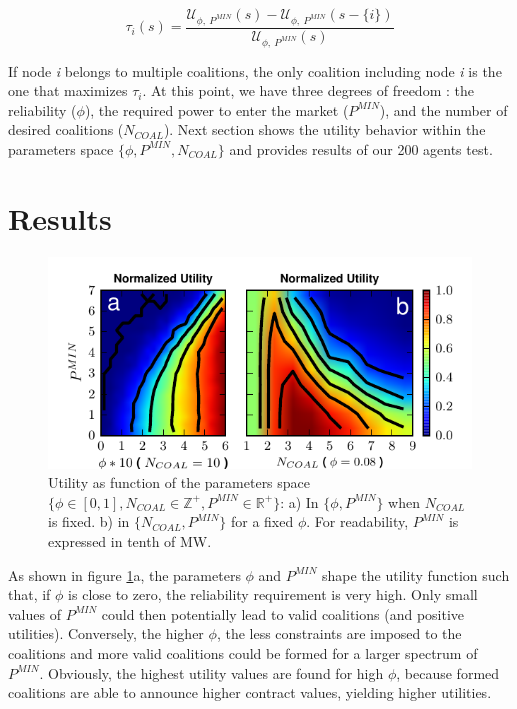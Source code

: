 \documentclass[conference]{IEEEtran}
\begin{document}
\begin{equation}
\tau_{i}(s) = \dfrac{\mathcal{U}_{\phi,\ P^{MIN}}(s) - \mathcal{U}_{\phi,\ P^{MIN}}(s-\{i\}) }{\mathcal{U}_{\phi,\ P^{MIN}}(s)}
\label{tau}
\end{equation}

If node \textit{i} belongs to  multiple coalitions, the only coalition including node \textit{i} is the one that maximizes $ \tau_{i} $. At this point, we have three degrees of freedom : the reliability ($ \phi $), the required power to enter the market ($P^{MIN}$), and the number of desired coalitions ($ N_{COAL} $). Next section shows the utility behavior within the parameters space $ \{\phi,P^{MIN},N_{COAL} \} $ and provides results of our 200 agents test.

\section{Results}
\label{sec:results}

\begin{figure}
 \centering
  \includegraphics[scale=0.9]{./figure9/util}
\caption{Utility as function of the parameters space $\{\phi \in [0,1], N_{COAL}\in \mathbb{Z}^+, P^{MIN} \in \mathbb{R}^+\}$: a) In $ \{\phi, P^{MIN}\} $ when $ N_{COAL} $ is fixed. b) in $ \{N_{COAL}, P^{MIN}\} $ for a fixed $ \phi $. For readability, $ P^{MIN} $ is expressed in tenth of MW.}
\label{Fig2}
\end{figure}

As shown in figure \ref{Fig2}a, the parameters $\phi$ and $P^{MIN}$ shape the utility function such that, if $ \phi $ is close to zero, the reliability requirement is very high. Only small values of $ P^{MIN}$ could then potentially lead to valid coalitions (and positive utilities). Conversely, the higher $\phi$, the less constraints are imposed to the coalitions and more valid coalitions could be formed for a larger spectrum of $ P^{MIN}$. Obviously, the highest utility values are found for high $ \phi $, because formed coalitions are able to announce higher contract values, yielding higher utilities. 
\end{document}
